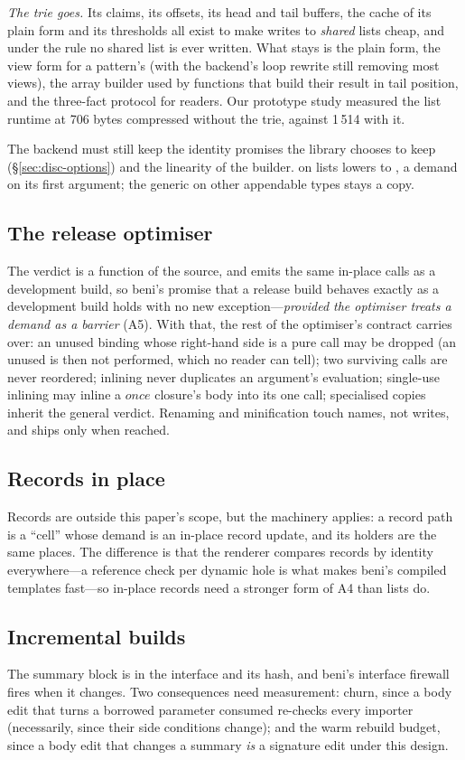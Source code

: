 \emph{The trie goes.} Its claims, its offsets, its head and tail buffers, the cache of its plain form
and its thresholds all exist to make writes to \emph{shared} lists cheap, and under the rule no shared
list is ever written. What stays is the plain form, the view form for a pattern's  (with the
backend's loop rewrite still removing most views), the array builder used by functions that build their
result in tail position, and the three-fact protocol for readers. Our prototype study measured the list
runtime at 706 bytes compressed without the trie, against 1\,514 with it.

The backend must still keep the identity promises the library chooses to keep (\S\ref{sec:disc-options})
and the linearity of the builder. \code{++} on lists lowers to , a demand on its first
argument; the generic \code{++} on other appendable types stays a copy.

\subsection{The release optimiser}

The verdict is a function of the source, and  emits the same in-place calls as a
development build, so beni's promise that a release build behaves exactly as a development build holds
with no new exception---\emph{provided the optimiser treats a demand as a barrier} (A5). With that, the
rest of the optimiser's contract carries over: an unused binding whose right-hand side is a pure call
may be dropped (an unused  is then not performed, which no reader can tell); two surviving
calls are never reordered; inlining never duplicates an argument's evaluation; single-use inlining may
inline a $\mathit{once}$ closure's body into its one call; specialised copies inherit the general
verdict. Renaming and minification touch names, not writes, and  ships only when reached.

\subsection{Records in place}
\label{sec:compiler-records}

Records are outside this paper's scope, but the machinery applies: a record path is a ``cell'' whose
demand is an in-place record update, and its holders are the same places. The difference is that the
renderer compares records by identity everywhere---a reference check per dynamic hole is what makes
beni's compiled templates fast---so in-place records need a stronger form of A4 than lists do.

\subsection{Incremental builds}

The summary block is in the interface and its hash, and beni's interface firewall fires when it
changes. Two consequences need measurement: churn, since a body edit that turns a borrowed parameter
consumed re-checks every importer (necessarily, since their side conditions change); and the warm
rebuild budget, since a body edit that changes a summary \emph{is} a signature edit under this design.

